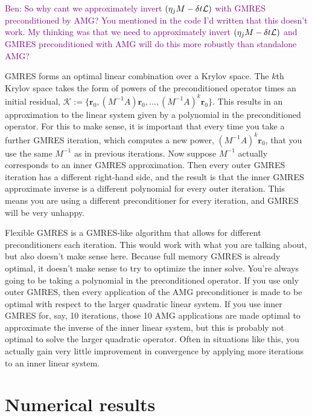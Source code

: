 \documentclass[review]{siamart}
\newcommand{\tcp}{\textcolor{purple}}
\begin{document}
\tcp{Ben: So why cant we approximately invert $(\eta_j M - \delta t {\cal L})$ with GMRES preconditioned by AMG? You mentioned in the code I'd written that this doesn't work. My thinking was that we need to approximately invert $(\eta_j M - \delta t {\cal L})$ and GMRES preconditioned with AMG will do this more robustly than standalone AMG?}
{\color{blue}
GMRES forms an optimal linear combination over a Krylov space. The $k$th Krylov space takes the form of powers
of the preconditioned operator times an initial residual, $\mathcal{K} := \{\mathbf{r}_0, (M^{-1}A)\mathbf{r}_0, 
..., (M^{-1}A)^k\mathbf{r}_0\}$. This results in an approximation to the linear system given by a polynomial
in the preconditioned operator. For this to make sense, it is important that every time you take a further
GMRES iteration, which computes a new power, $(M^{-1}A)^k\mathbf{r}_0$, that you use the same $M^{-1}$ as in
previous iterations. Now suppose $M^{-1}$ actually corresponds to an inner GMRES approximation. Then every
outer GMRES iteration has a different right-hand side, and the result is that the inner GMRES approximate 
inverse is a different polynomial for every outer iteration. This means you are using a different preconditioner
for every iteration, and GMRES will be very unhappy.

Flexible GMRES is a GMRES-like algorithm that allows for different preconditioners each iteration. This would
work with what you are talking about, but also doesn't make sense here. Because full memory GMRES is already
optimal, it doesn't make sense to try to optimize the inner solve. You're always going to be taking a polynomial
in the preconditioned operator. If you use only outer GMRES, then every application of the AMG preconditioner is 
made to be optimal with respect to the larger quadratic linear system. If you use inner GMRES for, say, 10
iterations,  those 10 AMG applications are made optimal to approximate the inverse of the inner linear system,
but this is probably not optimal to solve the larger quadratic operator. Often in situations like this, you
actually gain very little improvement in convergence by applying more iterations to an inner linear system.
}


\section{Numerical results}
\end{document}
